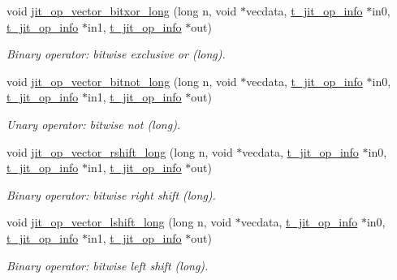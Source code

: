 \begin{DoxyCompactItemize}
void \hyperlink{group__opvecmod_ga5ddfa9c091f3f2bf01e498ad6bfd2a67}{jit\_\-op\_\-vector\_\-bitxor\_\-long} (long n, void $\ast$vecdata, \hyperlink{structt__jit__op__info}{t\_\-jit\_\-op\_\-info} $\ast$in0, \hyperlink{structt__jit__op__info}{t\_\-jit\_\-op\_\-info} $\ast$in1, \hyperlink{structt__jit__op__info}{t\_\-jit\_\-op\_\-info} $\ast$out)
\begin{DoxyCompactList}\small\item\em Binary operator: bitwise exclusive or (long). \item\end{DoxyCompactList}\item 
void \hyperlink{group__opvecmod_gaddf8d190578e7549c6cce45bbf7a7a93}{jit\_\-op\_\-vector\_\-bitnot\_\-long} (long n, void $\ast$vecdata, \hyperlink{structt__jit__op__info}{t\_\-jit\_\-op\_\-info} $\ast$in0, \hyperlink{structt__jit__op__info}{t\_\-jit\_\-op\_\-info} $\ast$in1, \hyperlink{structt__jit__op__info}{t\_\-jit\_\-op\_\-info} $\ast$out)
\begin{DoxyCompactList}\small\item\em Unary operator: bitwise not (long). \item\end{DoxyCompactList}\item 
void \hyperlink{group__opvecmod_gab1d87cd5a79ba9d336d75442d996c7b4}{jit\_\-op\_\-vector\_\-rshift\_\-long} (long n, void $\ast$vecdata, \hyperlink{structt__jit__op__info}{t\_\-jit\_\-op\_\-info} $\ast$in0, \hyperlink{structt__jit__op__info}{t\_\-jit\_\-op\_\-info} $\ast$in1, \hyperlink{structt__jit__op__info}{t\_\-jit\_\-op\_\-info} $\ast$out)
\begin{DoxyCompactList}\small\item\em Binary operator: bitwise right shift (long). \item\end{DoxyCompactList}\item 
void \hyperlink{group__opvecmod_ga086051a9de64af7a3e788d496b720faa}{jit\_\-op\_\-vector\_\-lshift\_\-long} (long n, void $\ast$vecdata, \hyperlink{structt__jit__op__info}{t\_\-jit\_\-op\_\-info} $\ast$in0, \hyperlink{structt__jit__op__info}{t\_\-jit\_\-op\_\-info} $\ast$in1, \hyperlink{structt__jit__op__info}{t\_\-jit\_\-op\_\-info} $\ast$out)
\begin{DoxyCompactList}\small\item\em Binary operator: bitwise left shift (long). \item\end{DoxyCompactList}\item 

\end{DoxyCompactItemize}
